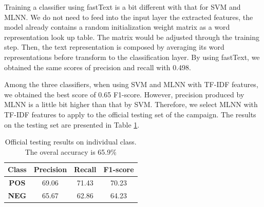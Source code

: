 \documentclass[conference,compsoc]{IEEEtran}
\begin{document}
Training a classifier using fastText is a bit different with that for SVM and MLNN. We do not need to feed into the input layer the extracted features, the model already contains a random initialization weight matrix as a word representation look up table. The matrix would be adjusted through the training step. Then, the text representation is composed by averaging its word representations before transform to the classification layer.
By using fastText, we obtained the same scores of precision and recall with 0.498. 



Among the three classifiers, when using SVM and MLNN with TF-IDF features, we obtained the best score of 0.65 F1-score. However, precision produced by MLNN is a little bit higher than that by SVM. Therefore, we select MLNN with TF-IDF features to apply to the official testing set of the campaign. The results on the testing set are presented in Table \ref{tb-test}. 


\begin{table}[htp!]
\centering
\caption{Official testing results on individual class. The overal accuracy is 65.9\%}
\label{tb-test}
\begin{tabular}{|c|c|c|c|}
\hline
    \bf Class        & \multicolumn{1}{l|}{\textbf{Precision}} & \multicolumn{1}{l|}{\textbf{Recall}} & \textbf{F1-score} \\ \hline
\textbf{POS} & 69.06                                   & 71.43                                & 70.23             \\ \hline
\textbf{NEG} & 65.67                                   & 62.86                                & 64.23             \\ \hline
\end{tabular}
\end{table}
    
\end{document}
